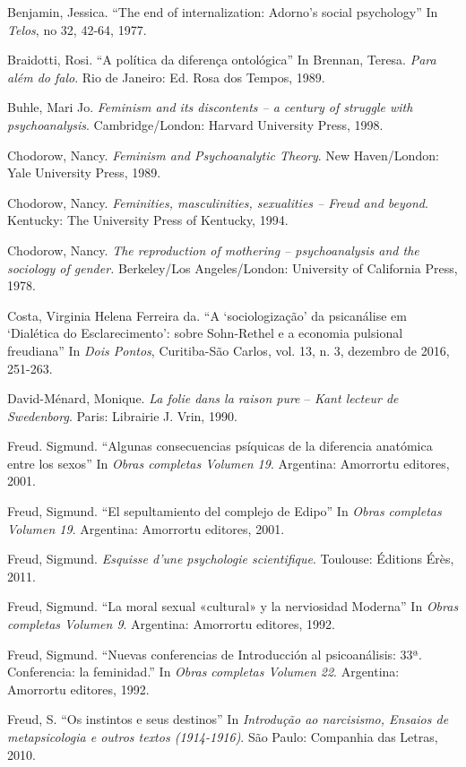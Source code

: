 Benjamin, Jessica. ``The end of internalization: Adorno's social
psychology'' In \emph{Telos}, no 32, 42-64, 1977.

Braidotti, Rosi. ``A política da diferença ontológica'' In Brennan,
Teresa. \emph{Para além do falo}. Rio de Janeiro: Ed. Rosa dos Tempos,
1989.

Buhle, Mari Jo. \emph{Feminism and its discontents -- a century of
struggle with psychoanalysis}. Cambridge/London: Harvard University
Press, 1998.

Chodorow, Nancy. \emph{Feminism and Psychoanalytic Theory}. New
Haven/London: Yale University Press, 1989.

Chodorow, Nancy. \emph{Feminities, masculinities, sexualities -- Freud
and beyond}. Kentucky: The University Press of Kentucky, 1994.

Chodorow, Nancy. \emph{The reproduction of mothering -- psychoanalysis
and the sociology of gender.} Berkeley/Los Angeles/London: University of
California Press, 1978.

Costa, Virginia Helena Ferreira da. ``A `sociologização' da
psicanálise em `Dialética do Esclarecimento': sobre Sohn-Rethel e a
economia pulsional freudiana'' In \emph{Dois Pontos}, Curitiba-São
Carlos, vol. 13, n. 3, dezembro de 2016, 251-263.

David-Ménard, Monique. \emph{La folie dans la raison
pure} -- \emph{Kant lecteur de Swedenborg}. Paris: Librairie J. Vrin,
1990.

Freud. Sigmund. ``Algunas consecuencias psíquicas de la diferencia
anatómica entre los sexos'' In \emph{Obras completas Volumen 19}.
Argentina: Amorrortu editores, 2001.

Freud, Sigmund. ``El sepultamiento del complejo de Edipo'' In
\emph{Obras completas Volumen 19}. Argentina: Amorrortu editores, 2001.

Freud, Sigmund. \emph{Esquisse d'une psychologie scientifique}.
Toulouse: Éditions Érès, 2011.

Freud, Sigmund. ``La moral sexual «cultural» y la nerviosidad
Moderna'' In \emph{Obras completas Volumen 9}. Argentina: Amorrortu
editores, 1992.

Freud, Sigmund. ``Nuevas conferencias de Introducción al
psicoanálisis: 33ª. Conferencia: la feminidad.'' In \emph{Obras
completas Volumen 22}. Argentina: Amorrortu editores, 1992.

Freud, S. ``Os instintos e seus destinos'' In
\emph{Introdução ao narcisismo, Ensaios de metapsicologia e outros
textos (1914-1916)}. São Paulo: Companhia das Letras, 2010.

